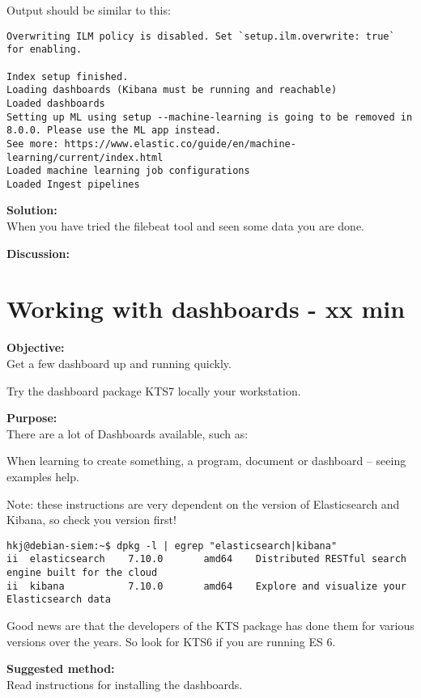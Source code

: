 \documentclass[a4paper,11pt,notitlepage]{report}
\begin{document}
Output should be similar to this:
\begin{verbatim}
Overwriting ILM policy is disabled. Set `setup.ilm.overwrite: true` for enabling.

Index setup finished.
Loading dashboards (Kibana must be running and reachable)
Loaded dashboards
Setting up ML using setup --machine-learning is going to be removed in 8.0.0. Please use the ML app instead.
See more: https://www.elastic.co/guide/en/machine-learning/current/index.html
Loaded machine learning job configurations
Loaded Ingest pipelines
\end{verbatim}


{\bf Solution:}\\
When you have tried the filebeat tool and seen some data you are done.

{\bf Discussion:}\\



\chapter{Working with dashboards - xx min}
\label{ex:}

{\bf Objective:}\\
Get a few dashboard up and running quickly.

Try the dashboard package KTS7 locally your workstation.


{\bf Purpose:}\\
There are a lot of Dashboards available, such as:\\

When learning to create something, a program, document or dashboard -- seeing examples help.

Note: these instructions are very dependent on the version of Elasticsearch and Kibana, so check you version first!
\begin{verbatim}
hkj@debian-siem:~$ dpkg -l | egrep "elasticsearch|kibana"
ii  elasticsearch    7.10.0       amd64    Distributed RESTful search engine built for the cloud
ii  kibana           7.10.0       amd64    Explore and visualize your Elasticsearch data
\end{verbatim}

Good news are that the developers of the KTS package has done them for various versions over the years. So look for KTS6 if you are running ES 6.

{\bf Suggested method:}\\
Read instructions for installing the dashboards.
\end{document}
